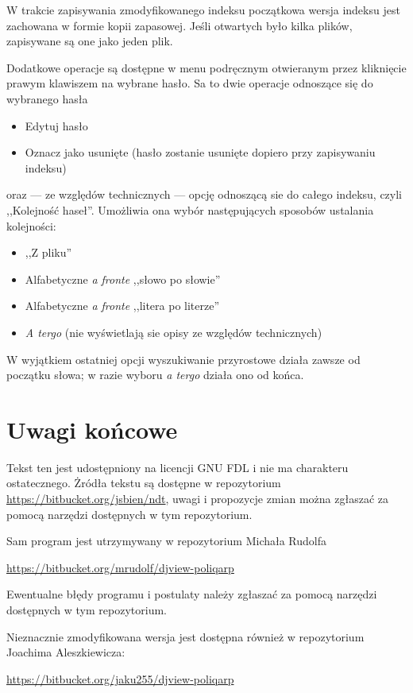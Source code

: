 \documentclass{mwart}
\begin{document}
W trakcie zapisywania zmodyfikowanego indeksu początkowa wersja
indeksu jest zachowana w formie kopii zapasowej. Jeśli otwartych było
kilka plików, zapisywane są one jako jeden plik.

Dodatkowe operacje są dostępne w menu podręcznym otwieranym przez
kliknięcie prawym klawiszem na wybrane hasło. Sa to dwie operacje
odnoszące się do wybranego hasła
\begin{itemize}
\item Edytuj hasło
\item Oznacz jako usunięte (hasło zostanie usunięte dopiero przy
  zapisywaniu indeksu)
\end{itemize}
oraz --- ze względów technicznych --- opcję odnoszącą sie do całego
indeksu, czyli ,,Kolejność haseł''. Umożliwia ona wybór następujących
sposobów ustalania kolejności:
\begin{itemize}
\item ,,Z pliku''
\item  Alfabetyczne \textit{a fronte} ,,słowo po słowie''
\item Alfabetyczne \textit{a fronte} ,,litera po literze''
\item \textit{A tergo} (nie wyświetlają sie opisy ze względów
  technicznych)
\end{itemize}
W wyjątkiem ostatniej opcji wyszukiwanie przyrostowe działa zawsze od
początku słowa; w razie wyboru \textit{a tergo} działa ono od końca.

\section{Uwagi końcowe}
\label{sec:uwagi-kocowe}

Tekst ten jest udostępniony na licencji GNU FDL i nie ma charakteru
ostatecznego. Żródła tekstu są dostępne w repozytorium
\url{https://bitbucket.org/jsbien/ndt}, uwagi i propozycje zmian można
zgłaszać za pomocą narzędzi dostępnych w tym repozytorium.

Sam program jest utrzymywany w repozytorium Michała Rudolfa

\url{https://bitbucket.org/mrudolf/djview-poliqarp}

Ewentualne błędy programu i postulaty należy zgłaszać za pomocą
narzędzi dostępnych w tym repozytorium.

Nieznacznie zmodyfikowana wersja jest dostępna również w 
repozytorium Joachima Aleszkiewicza:

\url{https://bitbucket.org/jaku255/djview-poliqarp}
\end{document}
